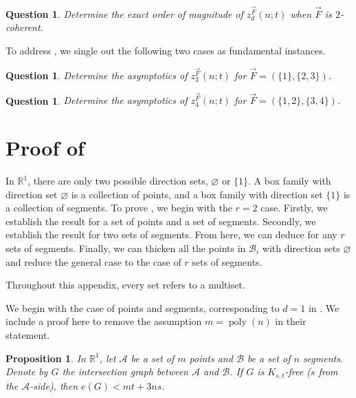 \documentclass[11pt]{article}
\newtheorem{proposition}[theorem]{Proposition}
\newtheorem{question}[theorem]{Question}
\theoremstyle{definition}
\newcommand*{\R}{\mathbb{R}}                                    %
\newcommand*{\vF}{\vec{F}}
\newcommand*{\cB}{\mathcal{B}}
\newcommand*{\cA}{\mathcal{A}}
\begin{document}
\begin{question} \label{exact2co}
    Determine the exact order of magnitude of $z_d^{\vF}(n; t)$ when $\vF$ is $2$-coherent.
\end{question}

To address , we single out the following two cases as fundamental instances. 

\begin{question}
    Determine the asymptotics of $z_3^{\vF}(n; t)$ for $\vF = (\{1\}, \{2, 3\})$. 
\end{question}

\begin{question}
    Determine the asymptotics of $z_4^{\vF}(n; t)$ for $\vF = (\{1, 2\}, \{3, 4\})$. 
\end{question}




\appendix

\section{Proof of \texorpdfstring{}{Lemma 4.7}} \label{append:upper_onedim}

In $\R^1$, there are only two possible direction sets, $\varnothing$ or $\{1\}$. A box family with direction set $\varnothing$ is a collection of points, and a box family with direction set $\{1\}$ is a collection of segments. To prove , we begin with the $r = 2$ case. Firstly, we establish the result for a set of points and a set of segments. Secondly, we establish the result for two sets of segments. From here, we can deduce  for any $r$ sets of segments. Finally, we can thicken all the points in $\cB_i$ with direction sets $\varnothing$ and reduce the general case to the case of $r$ sets of segments.

Throughout this appendix, every set refers to a multiset. 

\smallskip

We begin with the case of points and segments, corresponding to $d = 1$ in \cite[Lemma~2.1]{chan_har-peled}. We include a proof here to remove the assumption $m = \operatorname{poly}(n)$ in their statement. 

\begin{proposition} \label{prop:point_segment}
    In $\R^1$, let $\cA$ be a set of $m$ points and $\cB$ be a set of $n$ segments. Denote by $G$ the intersection graph between $\cA$ and $\cB$. If $G$ is $K_{s, t}$-free ($s$ from the $\cA$-side), then $e(G) < mt + 3ns$. 
\end{proposition}
\end{document}
